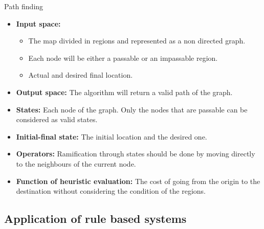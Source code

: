 \documentclass[10pt]{beamer}
\begin{document}
	     
	      \begin{frame}{Path finding}
	      \small
	           \begin{itemize}
		    \item \textbf{Input space:}
		      \begin{itemize}
			 \footnotesize
			 \item The map divided in regions and represented as a non directed graph.
			 \item Each node will be either a passable or an impassable region.
			 \item Actual and desired final location.
		      \end{itemize}
		    \item \textbf{Output space:} The algorithm will return a valid path of the graph.
		    \item \textbf{States:} Each node of the graph. Only the nodes that are passable can be considered as valid states. 
		    \item \textbf{Initial-final state:} The initial location and the desired one.
		    \item \textbf{Operators:} Ramification through states should be done by moving directly to the neighbours of the current node.
		    \item \textbf{Function of heuristic evaluation:} The cost of going from the origin to the destination without considering the condition of the regions.
		   \end{itemize}
	      \end{frame}


	    \subsection{Application of rule based systems}
\end{document}
